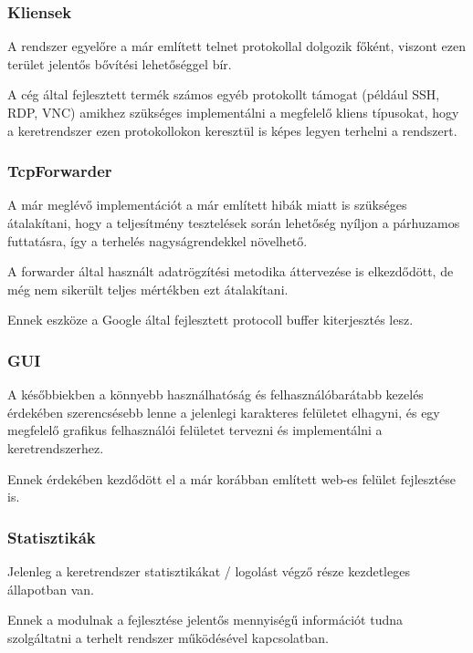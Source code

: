 \documentclass[a4paper,12pt,oneside]{report}
\begin{document}
\subsubsection{Kliensek}

A rendszer egyelőre a már említett telnet protokollal dolgozik főként, viszont ezen terület jelentős bővítési lehetőséggel bír.

A cég által fejlesztett termék számos egyéb protokollt támogat (például SSH, RDP, VNC) amikhez szükséges implementálni a megfelelő kliens típusokat, hogy a keretrendszer ezen protokollokon keresztül is képes legyen terhelni a rendszert.

\subsubsection{TcpForwarder}

A már meglévő implementációt a már említett hibák miatt is szükséges átalakítani, hogy a teljesítmény tesztelések során lehetőség nyíljon a párhuzamos futtatásra, így a terhelés nagyságrendekkel növelhető.


A forwarder által használt adatrögzítési metodika áttervezése is elkezdődött, de még nem sikerült teljes mértékben ezt átalakítani.

Ennek eszköze a Google által fejlesztett protocoll buffer kiterjesztés lesz. \cite{website:protobuf}



\subsubsection{GUI}

A későbbiekben a könnyebb használhatóság és felhasználóbarátabb kezelés érdekében szerencsésebb lenne a jelenlegi karakteres felületet elhagyni, és egy megfelelő grafikus felhasználói felületet tervezni és implementálni a keretrendszerhez.

Ennek érdekében kezdődött el a már korábban említett web-es felület fejlesztése is.

\subsubsection{Statisztikák}

Jelenleg a keretrendszer statisztikákat / logolást végző része kezdetleges állapotban van.

Ennek a modulnak a fejlesztése jelentős mennyiségű információt tudna szolgáltatni a terhelt rendszer működésével kapcsolatban.
\end{document}
